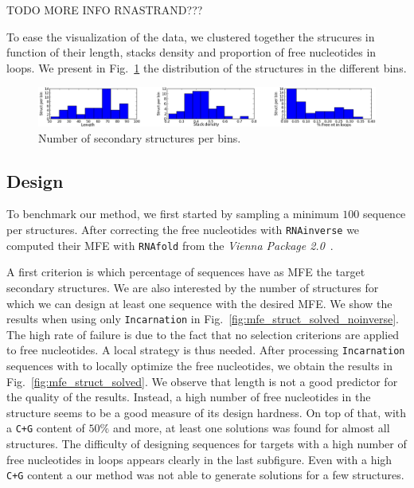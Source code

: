  TODO MORE INFO RNASTRAND???
 
 To ease the visualization of the data, we clustered together the strucures
 in function of their length, stacks density and proportion of free 
 nucleotides in loops. We present in Fig.~\ref{fig:bins} the distribution
 of the structures in the different bins.
 
 \begin{figure}[ht!]
 	\centering
	\includegraphics[scale=0.45]{Figures/bins_distribution.png}
	\caption{Number of secondary structures per bins.}
	\label{fig:bins}
 \end{figure}
 
 
\subsection{Design}
 To benchmark our method, we first started by sampling a minimum
 $100$ sequence per structures. After correcting the free nucleotides with
 \texttt{RNAinverse} we computed their MFE with \texttt{RNAfold} from the \textit{Vienna Package 2.0}~\cite{Hofacker:1994}.
 
A first criterion is which percentage of sequences have as MFE the target
secondary structures. We are also interested by the number of structures
for which we can design at least one sequence with the desired MFE.
We show the results when using only \texttt{Incarnation} in 
 Fig.~\ref{fig:mfe_struct_solved_noinverse}. The high rate of failure
is due to the fact that no selection criterions are applied to
free nucleotides. A local strategy is thus needed.
After processing \texttt{Incarnation} sequences with \RNAinverse to 
locally optimize the free nucleotides, we obtain the results 
in Fig.~\ref{fig:mfe_struct_solved}. We observe
that length is not a good predictor for the quality of the results. Instead,
a high number of free nucleotides in the structure seems to be a 
good measure of its design hardness. 
On top of that, with a \texttt{C+G} content of $50\%$ and more, at least
one solutions was found for almost all structures. The difficulty of 
designing sequences for targets with a high number of free nucleotides 
 in loops appears clearly in the last subfigure. Even with a high \texttt{C+G} content a our method was not able to generate solutions for a few
 structures. 

